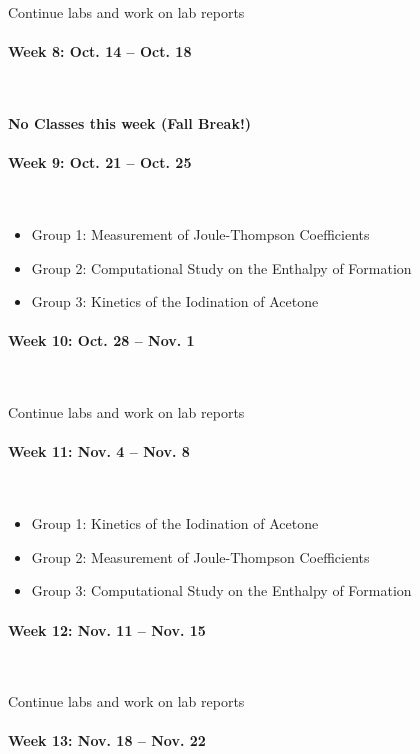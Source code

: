 \documentclass[12pt, letterpaper]{article}
\begin{document}
Continue labs and work on lab reports

\paragraph{Week 8: Oct. 14 -- Oct. 18}~

\textbf{No Classes this week (Fall Break!)}

\paragraph{Week 9: Oct. 21 -- Oct. 25}~

\begin{itemize}
  \item Group 1: Measurement of Joule-Thompson Coefficients
  \item Group 2: Computational Study on the Enthalpy of Formation
  \item Group 3: Kinetics of the Iodination of Acetone
\end{itemize}

\paragraph{Week 10: Oct. 28 -- Nov. 1}~

Continue labs and work on lab reports

\paragraph{Week 11: Nov. 4 -- Nov. 8}~

\begin{itemize}
  \item Group 1: Kinetics of the Iodination of Acetone
  \item Group 2: Measurement of Joule-Thompson Coefficients
  \item Group 3: Computational Study on the Enthalpy of Formation
\end{itemize}

\paragraph{Week 12: Nov. 11 -- Nov. 15}~

Continue labs and work on lab reports

\paragraph{Week 13: Nov. 18 -- Nov. 22}~
\end{document}

